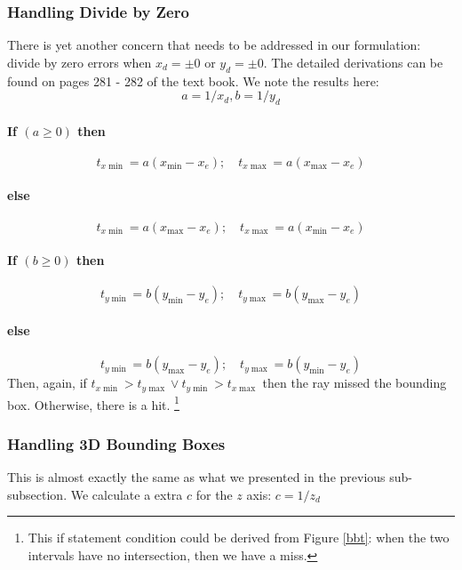 \documentclass[11pt]{article}
\begin{document}
\subsubsection{Handling Divide by Zero}
There is yet another concern that needs to be addressed in our formulation: divide by zero errors when $x_d = \pm 0$ or $y_d = \pm 0$. The detailed derivations can be found on pages 281 - 282 of the text book. We note the results here: 
\begin{equation}
	a = 1 / x_d, b = 1 / y_d
\end{equation}
\paragraph{If $(a \geq 0)$ then}
\begin{equation}
	t_{x\min} = a(x_{\min} - x_e); \quad t_{x\max} = a(x_{\max} - x_e)
\end{equation}
\vspace{-3em}
\paragraph{else}
\begin{equation}
	t_{x\min} = a(x_{\max} - x_e); \quad t_{x\max} = a(x_{\min} - x_e)
\end{equation}

\paragraph{If $(b \geq 0)$ then}
\begin{equation}
	t_{y\min} = b(y_{\min} - y_e); \quad t_{y\max} = b(y_{\max} - y_e)
\end{equation}
\vspace{-3em}
\paragraph{else}
\begin{equation}
	t_{y\min} = b(y_{\max} - y_e); \quad t_{y\max} = b(y_{\min} - y_e)
\end{equation}
Then, again, if $t_{x\min} > t_{y\max} \lor  t_{y\min} > t_{x\max} $ then the ray missed the bounding box. Otherwise, there is a hit. \footnote{This if statement condition could be derived from Figure \ref{bbt}: when the two intervals have no intersection, then we have a miss. }


\subsubsection{Handling 3D Bounding Boxes}
This is almost exactly the same as what we presented in the previous sub-subsection. We calculate a extra $c$ for the $z$ axis: $c = 1 / z_d$
\end{document}
